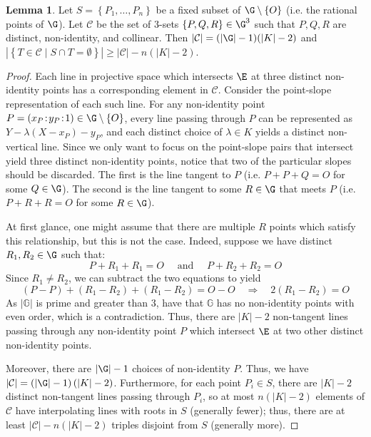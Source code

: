\documentclass[11pt,letterpaper]{article}
\theoremstyle{definition}
\newtheorem{lemm}[theorem]{Lemma}
\newcommand{\6}{\mathbf}
\newcommand{\7}{\mathcal}
\begin{document}
\begin{lemm}
\label{lem:number_collinear_triples}
Let $S=\left\{P_1, \ldots, P_n\right\}$ be a fixed subset of $\G \setminus \left\{O\right\}$ (i.e. the rational points of $\G$). Let $\mathcal{C}$ be the set of $3$-sets $\left\{P, Q, R\right\} \in \G^3$ such that $P, Q, R$ are distinct, non-identity, and collinear. Then $ \left|\mathcal{C}\right| = (\left|\G\right|-1)(\left|K\right|-2)$ and $\left|\left\{T \in \mathcal{C} \mid S \cap T = \emptyset  \right\}\right|  \geq \left|\mathcal{C}\right| - n(\left|K\right|-2)$.

\end{lemm}
\begin{proof}
Each line in projective space which intersects $\E$ at three distinct non-identity points has a corresponding element in $\mathcal{C}$. Consider the point-slope representation of each such line. For any non-identity point $P = (x_P\!:\!y_P\!:\!1)\in \G \setminus \left\{O\right\}$, every line passing through $P$ can be represented as $Y - \lambda (X-x_P) - y_P$, and each distinct choice of $\lambda \in K$ yields a distinct non-vertical line. Since we only want to focus on the point-slope pairs that intersect yield three distinct non-identity points, notice that two of the particular slopes should be discarded. The first is the line tangent to $P$ (i.e. $P+P+Q=O$ for some $Q \in \G$). The second is the line tangent to some $R \in \G$ that meets $P$ (i.e. $P+R+R=O$ for some $R \in \G$).

At first glance, one might assume that there are multiple $R$ points which satisfy this relationship, but this is not the case. Indeed, suppose we have distinct $R_1,R_2 \in \G$ such that: 
$$P+R_1+R_1=O \quad \text{ and } \quad P+R_2+R_2=O$$
Since $R_1\neq R_2$, we can subtract the two equations to yield $$(P-P)+(R_1-R_2)+(R_1-R_2)=O-O \quad \Rightarrow \quad 2(R_1-R_2)=O$$ As $\left|\mathbb{G}\right|$ is prime and greater than $3$,  have that $\mathbb{G}$ has no non-identity points with even order, which is a contradiction. Thus, there are $\left|K\right|-2$ non-tangent lines passing through any non-identity point $P$ which intersect $\E$ at two other distinct non-identity points.

Moreover, there are $\left|\G\right|-1$ choices of non-identity $P$. Thus, we have $\left|\mathcal{C}\right| = (\left|\G\right|-1)\left(\left|K\right|-2\right)$. Furthermore, for each point $P_i \in S$, there are $\left|K\right|-2$ distinct non-tangent lines passing through $P_i$, so at most $n(\left|K\right|-2)$ elements of $\mathcal{C}$ have interpolating lines with roots in $S$ (generally fewer); thus, there are at least $\left|\mathcal{C}\right| - n(\left|K\right|-2)$ triples disjoint from $S$ (generally more).
\end{proof}
\end{document}
